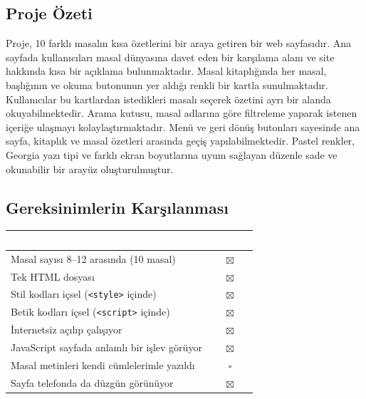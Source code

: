 \documentclass[12pt,a4paper]{article}
\begin{document}
\subsection{Proje Özeti}
Proje, 10 farklı masalın kısa özetlerini bir araya getiren bir web sayfasıdır. Ana sayfada kullanıcıları masal dünyasına davet eden bir karşılama alanı ve site hakkında kısa bir açıklama bulunmaktadır. Masal kitaplığında her masal, başlığının ve okuma butonunun yer aldığı renkli bir kartla sunulmaktadır. Kullanıcılar bu kartlardan istedikleri masalı seçerek özetini ayrı bir alanda okuyabilmektedir. Arama kutusu, masal adlarına göre filtreleme yaparak istenen içeriğe ulaşmayı kolaylaştırmaktadır. Menü ve geri dönüş butonları sayesinde ana sayfa, kitaplık ve masal özetleri arasında geçiş yapılabilmektedir. Pastel renkler, Georgia yazı tipi ve farklı ekran boyutlarına uyum sağlayan düzenle sade ve okunabilir bir arayüz oluşturulmuştur.

\subsection{Gereksinimlerin Karşılanması}
\begin{center}
\begin{tabular}{@{}p{8.2cm}c@{}}
\toprule
\rowcolor{ana}\textcolor{white}{\textbf{Gereksinim}} & \textcolor{white}{\textbf{Durum}} \\
\midrule
Masal sayısı 8--12 arasında (10 masal)         & $\boxtimes$ \\
Tek HTML dosyası                                    & $\boxtimes$ \\
Stil kodları içsel (\texttt{<style>} içinde)        & $\boxtimes$ \\
Betik kodları içsel (\texttt{<script>} içinde)      & $\boxtimes$ \\
İnternetsiz açılıp çalışıyor                        & $\boxtimes$ \\
JavaScript sayfada anlamlı bir işlev görüyor        & $\boxtimes$ \\
Masal metinleri kendi cümlelerimle yazıldı          & $\square$ \\
Sayfa telefonda da düzgün görünüyor                 & $\boxtimes$ \\
\bottomrule
\end{tabular}
\end{center}
\end{document}
